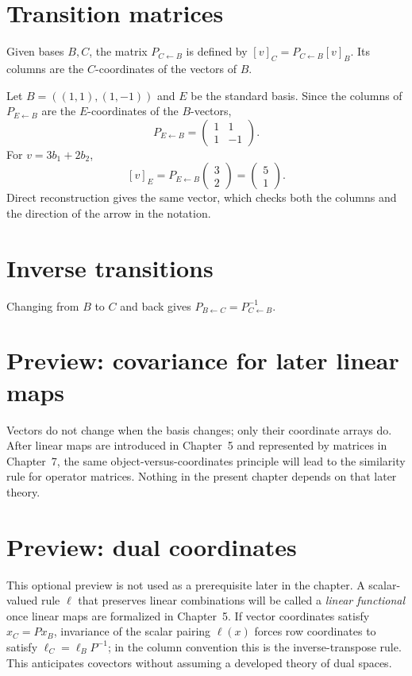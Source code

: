 \section{Transition matrices}
Given bases $B,C$, the matrix $P_{C\leftarrow B}$ is defined by $[v]_C=P_{C\leftarrow B}[v]_B$. Its columns are the $C$-coordinates of the vectors of $B$.


\begin{example}\label{ex:i04-expand-02}
Let \(B=((1,1),(1,-1))\) and \(E\) be the standard basis. Since the columns of
\(P_{E\leftarrow B}\) are the \(E\)-coordinates of the \(B\)-vectors,
\[
P_{E\leftarrow B}=\begin{pmatrix}1&1\\1&-1\end{pmatrix}.
\]
For \(v=3b_1+2b_2\),
\[
[v]_E=P_{E\leftarrow B}\begin{pmatrix}3\\2\end{pmatrix}
=\begin{pmatrix}5\\1\end{pmatrix}.
\]
Direct reconstruction gives the same vector, which checks both the columns and
the direction of the arrow in the notation.
\end{example}
\section{Inverse transitions}
Changing from $B$ to $C$ and back gives $P_{B\leftarrow C}=P_{C\leftarrow B}^{-1}$.

\section{Preview: covariance for later linear maps}
Vectors do not change when the basis changes; only their coordinate arrays do.
After linear maps are introduced in Chapter~5 and represented by matrices in
Chapter~7, the same object-versus-coordinates principle will lead to the
similarity rule for operator matrices. Nothing in the present chapter depends
on that later theory.

\section{Preview: dual coordinates}
This optional preview is not used as a prerequisite later in the chapter. A
scalar-valued rule $\ell$ that preserves linear combinations will be called a
\emph{linear functional} once linear maps are formalized in Chapter~5. If
vector coordinates satisfy $x_C=Px_B$, invariance of the scalar pairing
$\ell(x)$ forces row coordinates to satisfy $\ell_C=\ell_B P^{-1}$; in the
column convention this is the inverse-transpose rule. This anticipates
covectors without assuming a developed theory of dual spaces.

